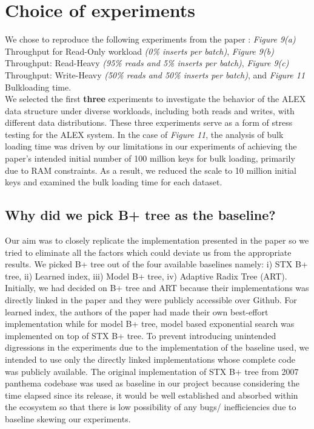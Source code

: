 \documentclass[12pt,a4paper]{article}
\begin{document}
\section{Choice of experiments}
We chose to reproduce the following experiments from the paper \cite{ding2020alex}: \emph{Figure 9(a)} Throughput for Read-Only workload \emph{(0\% inserts per batch)}, \emph{Figure 9(b)} Throughput: Read-Heavy \emph{(95\% reads and 5\% inserts per batch)}, \emph{Figure 9(c)} Throughput: Write-Heavy \emph{(50\% reads and 50\% inserts per batch)}, and \emph{Figure 11} Bulkloading time. \\
We selected the first \textbf{three} experiments to investigate the behavior of the ALEX data structure under diverse workloads, including both reads and writes, with different data distributions. These three experiments serve as a form of stress testing for the ALEX system. In the case of \emph{Figure 11}, the analysis of bulk loading time was driven by our limitations in our experiments of achieving the paper's intended initial number of 100 million keys for bulk loading, primarily due to RAM constraints. As a result, we reduced the scale to 10 million initial keys and examined the bulk loading time for each dataset.


\subsection{Why did we pick B+ tree as the baseline?}
Our aim was to closely replicate the implementation presented in the paper so we tried to eliminate all the factors which could deviate us from the appropriate results. We picked B+ tree out of the four available baselines namely: i) STX B+ tree, ii) Learned index, iii) Model B+ tree, iv) Adaptive Radix Tree (ART). Initially, we had decided on B+ tree and ART because their implementations was directly linked in the paper and they were publicly accessible over Github. For learned index, the authors of the paper had made their own best-effort implementation while for model B+ tree, model based exponential search was implemented on top of STX B+ tree. To prevent introducing unintended digressions in the experiments due to the implementation of the baseline used, we intended to use only the directly linked implementations whose complete code was publicly available. The original implementation of STX B+ tree from 2007 panthema codebase \cite{stx_btree} was used as baseline in our project because considering the time elapsed since its release, it would be well established and absorbed within the ecosystem so that there is low possibility of any bugs/ inefficiencies due to baseline skewing our experiments.
 
\end{document}
